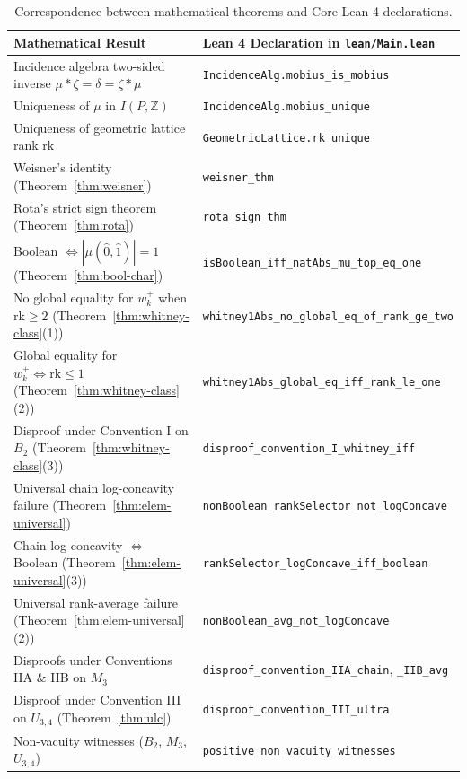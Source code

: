 \documentclass[11pt]{article}
\theoremstyle{definition}
\theoremstyle{remark}
\newcommand{\rk}{\mathrm{rk}}
\newcommand{\hatzero}{\hat{0}}
\newcommand{\hatone}{\hat{1}}
\newcommand{\Z}{\mathbb{Z}}
\begin{document}
\newpage
\begin{table}[!t]
\centering
\small
\renewcommand{\arraystretch}{1.24}
\begin{tabular}{@{}ll@{}}
\hline
\textbf{Mathematical Result} & \textbf{Lean 4 Declaration in \texttt{lean/Main.lean}} \\
\hline
Incidence algebra two-sided inverse $\mu * \zeta = \delta = \zeta * \mu$ & \texttt{IncidenceAlg.mobius\_is\_mobius} \\
Uniqueness of $\mu$ in $I(P, \Z)$ & \texttt{IncidenceAlg.mobius\_unique} \\
Uniqueness of geometric lattice rank $\rk$ & \texttt{GeometricLattice.rk\_unique} \\
Weisner's identity (Theorem~\ref{thm:weisner}) & \texttt{weisner\_thm} \\
Rota's strict sign theorem (Theorem~\ref{thm:rota}) & \texttt{rota\_sign\_thm} \\
Boolean $\Leftrightarrow |\mu(\hatzero,\hatone)|=1$ (Theorem~\ref{thm:bool-char}) & \texttt{isBoolean\_iff\_natAbs\_mu\_top\_eq\_one} \\
No global equality for $w_k^+$ when $\rk \ge 2$ (Theorem~\ref{thm:whitney-class}(1)) & \texttt{whitney1Abs\_no\_global\_eq\_of\_rank\_ge\_two} \\
Global equality for $w_k^+ \Leftrightarrow \rk \le 1$ (Theorem~\ref{thm:whitney-class}(2)) & \texttt{whitney1Abs\_global\_eq\_iff\_rank\_le\_one} \\
Disproof under Convention I on $B_2$ (Theorem~\ref{thm:whitney-class}(3)) & \texttt{disproof\_convention\_I\_whitney\_iff} \\
Universal chain log-concavity failure (Theorem~\ref{thm:elem-universal}) & \texttt{nonBoolean\_rankSelector\_not\_logConcave} \\
Chain log-concavity $\Leftrightarrow$ Boolean (Theorem~\ref{thm:elem-universal}(3)) & \texttt{rankSelector\_logConcave\_iff\_boolean} \\
Universal rank-average failure (Theorem~\ref{thm:elem-universal}(2)) & \texttt{nonBoolean\_avg\_not\_logConcave} \\
Disproofs under Conventions IIA \& IIB on $M_3$ & \texttt{disproof\_convention\_IIA\_chain}, \texttt{\_IIB\_avg} \\
Disproof under Convention III on $U_{3,4}$ (Theorem~\ref{thm:ulc}) & \texttt{disproof\_convention\_III\_ultra} \\
Non-vacuity witnesses ($B_2$, $M_3$, $U_{3,4}$) & \texttt{positive\_non\_vacuity\_witnesses} \\
\hline
\end{tabular}
\caption{Correspondence between mathematical theorems and Core Lean 4 declarations.}
\label{tab:lean}
\end{table}
\end{document}
